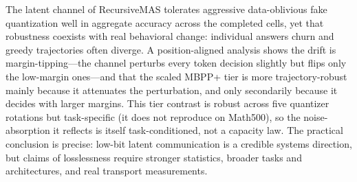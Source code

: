 \documentclass{article}
\begin{document}
The latent channel of RecursiveMAS tolerates aggressive data-oblivious fake
quantization well in aggregate accuracy across the completed cells, yet that robustness
coexists with real behavioral change: individual answers churn and greedy trajectories
often diverge. A position-aligned analysis shows the drift is margin-tipping---the channel
perturbs every token decision slightly but flips only the low-margin ones---and that the
scaled MBPP+ tier is more trajectory-robust mainly because it attenuates the perturbation,
and only secondarily because it decides with larger margins. This tier contrast is robust
across five quantizer rotations but task-specific (it does not reproduce on Math500), so the
noise-absorption it reflects is itself task-conditioned, not a capacity law. The practical
conclusion is precise: low-bit latent communication is a credible systems direction, but
claims of losslessness require stronger statistics, broader tasks and architectures, and real
transport measurements.



\end{document}
